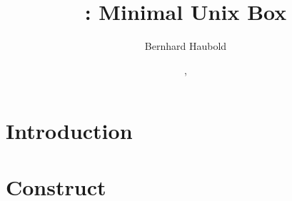 \documentclass[a4paper]{report}
\begin{document}
\pagestyle{noweb}

\title{: Minimal Unix Box}
\author{Bernhard Haubold}
\date{\!\!, }
\maketitle

\tableofcontents

\chapter{Introduction}

\chapter{Construct }\label{ch:mix}



\end{document}
